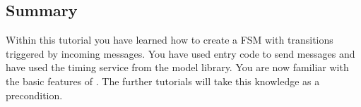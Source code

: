 \subsection{Summary}

Within this tutorial you have learned how to create a FSM with transitions triggered by incoming messages. You have used entry code to send messages and have used the timing service from the model library. You are now familiar with the basic features of \eTrice{}. The further tutorials will take this knowledge as a precondition.

